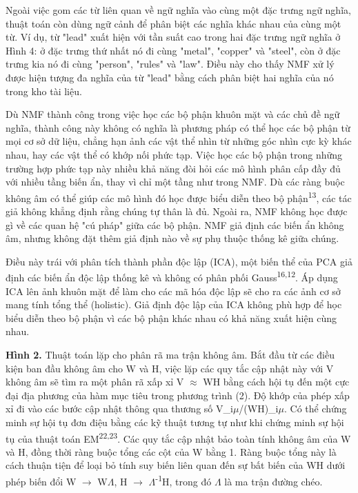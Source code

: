Ngoài việc gom các từ liên quan về ngữ nghĩa vào cùng một đặc trưng ngữ nghĩa, thuật toán còn dùng ngữ cảnh để phân biệt các nghĩa khác nhau của cùng một từ. Ví dụ, từ "lead" xuất hiện với tần suất cao trong hai đặc trưng ngữ nghĩa ở Hình 4: ở đặc trưng thứ nhất nó đi cùng "metal", "copper" và "steel", còn ở đặc trưng kia nó đi cùng "person", "rules" và "law". Điều này cho thấy NMF xử lý được hiện tượng đa nghĩa của từ "lead" bằng cách phân biệt hai nghĩa của nó trong kho tài liệu.

Dù NMF thành công trong việc học các bộ phận khuôn mặt và các chủ đề ngữ nghĩa, thành công này không có nghĩa là phương pháp có thể học các bộ phận từ mọi cơ sở dữ liệu, chẳng hạn ảnh các vật thể nhìn từ những góc nhìn cực kỳ khác nhau, hay các vật thể có khớp nối phức tạp. Việc học các bộ phận trong những trường hợp phức tạp này nhiều khả năng đòi hỏi các mô hình phân cấp đầy đủ với nhiều tầng biến ẩn, thay vì chỉ một tầng như trong NMF. Dù các ràng buộc không âm có thể giúp các mô hình đó học được biểu diễn theo bộ phận\textsuperscript{13}, các tác giả không khẳng định rằng chúng tự thân là đủ. Ngoài ra, NMF không học được gì về các quan hệ "cú pháp" giữa các bộ phận. NMF giả định các biến ẩn không âm, nhưng không đặt thêm giả định nào về sự phụ thuộc thống kê giữa chúng.

Điều này trái với phân tích thành phần độc lập (ICA), một biến thể của PCA giả định các biến ẩn độc lập thống kê và không có phân phối Gauss\textsuperscript{16,12}. Áp dụng ICA lên ảnh khuôn mặt để làm cho các mã hóa độc lập sẽ cho ra các ảnh cơ sở mang tính tổng thể (holistic). Giả định độc lập của ICA không phù hợp để học biểu diễn theo bộ phận vì các bộ phận khác nhau có khả năng xuất hiện cùng nhau.

\textbf{Hình 2.} Thuật toán lặp cho phân rã ma trận không âm. Bắt đầu từ các điều kiện ban đầu không âm cho W và H, việc lặp các quy tắc cập nhật này với V không âm sẽ tìm ra một phân rã xấp xỉ V \ensuremath{\approx} WH bằng cách hội tụ đến một cực đại địa phương của hàm mục tiêu trong phương trình (2). Độ khớp của phép xấp xỉ đi vào các bước cập nhật thông qua thương số V\_i\ensuremath{\mu}/(WH)\_i\ensuremath{\mu}. Có thể chứng minh sự hội tụ đơn điệu bằng các kỹ thuật tương tự như khi chứng minh sự hội tụ của thuật toán EM\textsuperscript{22,23}. Các quy tắc cập nhật bảo toàn tính không âm của W và H, đồng thời ràng buộc tổng các cột của W bằng 1. Ràng buộc tổng này là cách thuận tiện để loại bỏ tính suy biến liên quan đến sự bất biến của WH dưới phép biến đổi W \ensuremath{\rightarrow} W\ensuremath{\Lambda}, H \ensuremath{\rightarrow} \ensuremath{\Lambda}\textsuperscript{-1}H, trong đó \ensuremath{\Lambda} là ma trận đường chéo.


